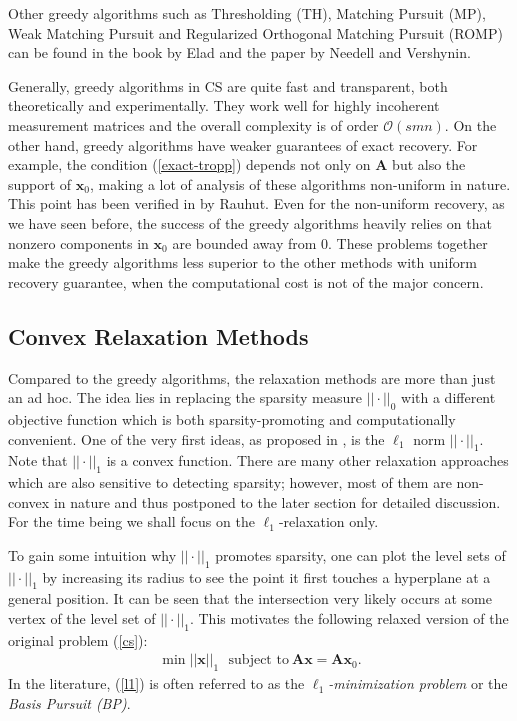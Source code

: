 \documentclass[11pt]{article}
\numberwithin{equation}{section}
\theoremstyle{plain}
\theoremstyle{definition}
\def\A{{\mathbf A}}
\def\x{{\mathbf x}}
\begin{document}
Other greedy algorithms such as Thresholding (TH), Matching Pursuit (MP), Weak Matching Pursuit and Regularized Orthogonal Matching Pursuit (ROMP) can be found in the book \cite{elad2010sparse} by Elad and the paper \cite{needell2009uniform} by Needell and Vershynin.

Generally, greedy algorithms in CS are quite fast and transparent, both theoretically and experimentally. They work well for highly incoherent measurement matrices and the overall complexity is of order $\mathcal{O}(smn)$. On the other hand, greedy algorithms have weaker guarantees of exact recovery. For example, the condition (\ref{exact-tropp}) depends not only on $\A$ but also the support of $\x_0$, making a lot of analysis of these algorithms non-uniform in nature. This point has been verified in \cite{rauhut2008impossibility} by Rauhut. Even for the non-uniform recovery, as we have seen before, the success of the greedy algorithms heavily relies on that nonzero components in $\x_0$ are bounded away from $0$. These problems together make the greedy algorithms less superior to the other methods with uniform recovery guarantee, when the computational cost is not of the major concern.    



\subsection{Convex Relaxation Methods}\label{l1-section}
  
Compared to the greedy algorithms, the relaxation methods are more than just an ad hoc. The idea lies in replacing the sparsity measure $|| \cdot||_0$ with a different objective function which is both sparsity-promoting and computationally convenient. One of the very first ideas, as proposed in \cite{donoho2006compressed}, is the $\ell_1$ norm $|| \cdot||_1$. Note that $|| \cdot||_1$ is a convex function. There are many other relaxation approaches which are also sensitive to detecting sparsity; however, most of them are non-convex in nature and thus postponed to the later section for detailed discussion. For the time being we shall focus on the $\ell_1$-relaxation only.

To gain some intuition why $|| \cdot||_1$ promotes sparsity, one can plot the level sets of $|| \cdot||_1$ by increasing its radius to see the point it first touches a hyperplane at a general position. It can be seen that the intersection very likely occurs at some vertex of the level set of $|| \cdot||_1$. This motivates the following relaxed version of the original problem (\ref{cs}): 
\begin{align}
\min ||\x||_1 \ \ \ \text{subject to}\ \A\x=\A\x_0.\label{l1}
\end{align}
In the literature, (\ref{l1}) is often referred to as the \emph{$\ell_1$-minimization problem} or the \emph{Basis Pursuit (BP)}. 
\end{document}
